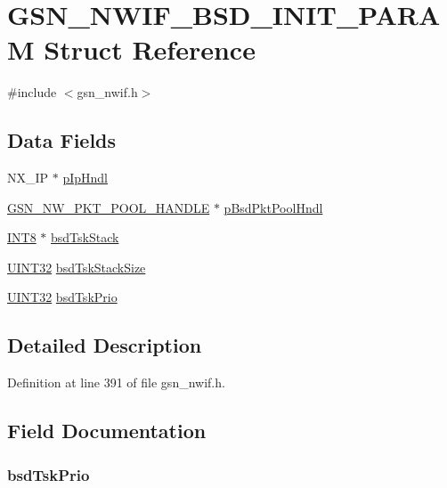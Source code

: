 \hypertarget{a00166}{
\section{GSN\_\-NWIF\_\-BSD\_\-INIT\_\-PARAM Struct Reference}
\label{a00166}
}


{\ttfamily \#include $<$gsn\_\-nwif.h$>$}

\subsection*{Data Fields}
\begin{DoxyCompactItemize}
\item 
NX\_\-IP $\ast$ \hyperlink{a00166_a5e6c19246ee28d20aff00e797fb7b999}{pIpHndl}
\item 
\hyperlink{a00532_afccc5835aa5e2916600678de68186848}{GSN\_\-NW\_\-PKT\_\-POOL\_\-HANDLE} $\ast$ \hyperlink{a00166_a3482188b6a89ad4bf9a3b4afe2d6a047}{pBsdPktPoolHndl}
\item 
\hyperlink{a00660_ga307b8734c020247f6bac4fcde0dcfbb9}{INT8} $\ast$ \hyperlink{a00166_a89fbf1872eb4a156e9c56d2b3eacb825}{bsdTskStack}
\item 
\hyperlink{a00660_gae1e6edbbc26d6fbc71a90190d0266018}{UINT32} \hyperlink{a00166_a31dfb09fdd700d7cbfd9db7b9001cbdf}{bsdTskStackSize}
\item 
\hyperlink{a00660_gae1e6edbbc26d6fbc71a90190d0266018}{UINT32} \hyperlink{a00166_a312daf3b091ce837baf7bc89437041d5}{bsdTskPrio}
\end{DoxyCompactItemize}


\subsection{Detailed Description}


Definition at line 391 of file gsn\_\-nwif.h.



\subsection{Field Documentation}
\hypertarget{a00166_a312daf3b091ce837baf7bc89437041d5}{
\subsubsection[{bsdTskPrio}]{ {\bf bsdTskPrio}}}
\label{a00166_a312daf3b091ce837baf7bc89437041d5}


